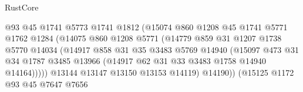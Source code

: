 \begin{lexlean}{RustCore}
\begin{coremodule}
                                        @93
                                        @45
                                        @1741
                                        @5773
                                        @1741
                                        @1812
                                        (@15074
                                          @860
                                          @1208
                                          @45
                                          @1741
                                          @5771
                                          @1762
                                          @1284
                                          (@14075
                                            @860
                                            @1208
                                            @5771
                                            (@14779
                                              @859
                                              @31
                                              @1207
                                              @1738
                                              @5770
                                              @14034
                                              (@14917
                                                @858
                                                @31
                                                @35
                                                @3483
                                                @5769
                                                @14940
                                                (@15097
                                                  @473
                                                  @31
                                                  @34
                                                  @1787
                                                  @3485
                                                  @13966
                                                  (@14917 @62 @31 @33 @3483 @1758 @14940 @14164)))))
                                          @13144
                                          @13147
                                          @13150
                                          @13153
                                          @14119)
                                        @14190))
                                    (@15125
                                      @1172
                                      @93
                                      @45
                                      @7647
                                      @7656

\end{coremodule}
\end{lexlean}
